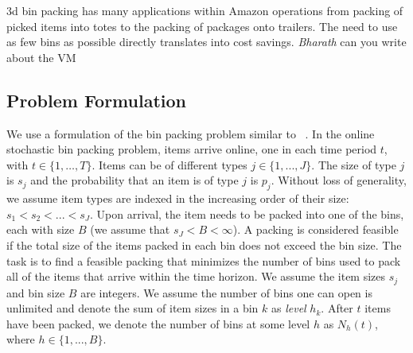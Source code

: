 \documentclass[letterpaper]{article} %
\newcommand{\citet}[1]{\citeauthor{#1}~\shortcite{#1}}
\begin{document}


\ifx 3d bin packing has many applications within Amazon operations from packing of picked items into totes to the packing of packages onto trailers. The need to use as few bins as possible directly translates into cost savings. \emph{Bharath} can you write about the VM
\fi

\subsection{Problem Formulation} \label{sec: bin_packing_prob_form}
We use a formulation of the bin packing problem similar to \citet{gupta2012online}. In the online stochastic bin packing problem, items arrive online, one in each time period $t$, with $t \in \{1, \ldots, T\}$. Items can be of different types $j \in \{1,...,J\}$. The size of type $j$ is $s_j$ and the probability that an item is of type $j$ is $p_j$. Without loss of generality, we assume item types are indexed in the increasing order of their size: $s_1 < s_2 < ... < s_J$. Upon arrival, the item needs to be packed into one of the bins, each with size $B$ (we assume that $s_J < B < \infty$). A packing is considered feasible if the total size of the items packed in each bin does not exceed the bin size. The task is to find a feasible packing that minimizes the number of bins used to pack all of the items that arrive within the time horizon. We assume the item sizes $s_j$ and bin size $B$ are integers. We assume the number of bins one can open is unlimited and denote the sum of item sizes in a bin $k$ as \emph{level} $h_{k}$. After $t$ items have been packed, we denote the number of bins at some level $h$ as $N_h(t)$, where $h \in \{1,...,B\}$. 
\end{document}

